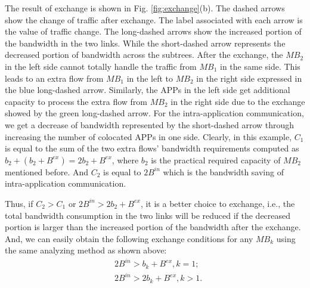 \documentclass[review]{elsarticle}
\begin{document}
The result of exchange is shown in Fig. \ref{fig:exchange}(b). The dashed arrows show the change of traffic after exchange. The label associated with each arrow is the value of traffic change. %
 The long-dashed arrows show the increased portion of the bandwidth in the two links. While the short-dashed arrow represents the decreased portion of bandwidth across the subtrees. After the exchange, the $MB_2$ in the left side cannot totally handle the traffic from $MB_1$ in the same side. This leads to an extra flow from $MB_1$ in the left to $MB_2$ in the right side expressed in the blue long-dashed arrow. Similarly, the APPs in the left side get additional capacity to process the extra flow from $MB_2$ in the right side due to the exchange showed by the green long-dashed arrow. For the intra-application communication, we get a decrease of bandwidth represented by the short-dashed arrow through increasing the number of colocated APPs in one side. Clearly, in this example, $C_1$ is equal to the sum of the two extra flows' bandwidth requirements computed as $b_2+(b_2+B^{ex})=2b_2+B^{ex}$, where $b_2$ is the practical required capacity of $MB_2$ mentioned before.
 And $C_2$ is equal to $2B^{in}$ which is the bandwidth saving of intra-application communication. 

Thus, if $C_2>C_1$ or $2B^{in} > 2b_2 + B^{ex}$, it is a better choice to exchange, i.e., the total bandwidth consumption in the two links will be reduced if the decreased portion is larger than the increased portion of the bandwidth after the exchange. And, we can easily obtain the following exchange conditions for any $MB_k$ using the same analyzing method as shown above: 
\begin{equation}
\begin{aligned}
&2B^{in}>b_k+B^{ex},k=1;\\
&2B^{in}>2b_k+B^{ex},k>1.
\end{aligned}
\end{equation}
\end{document}
